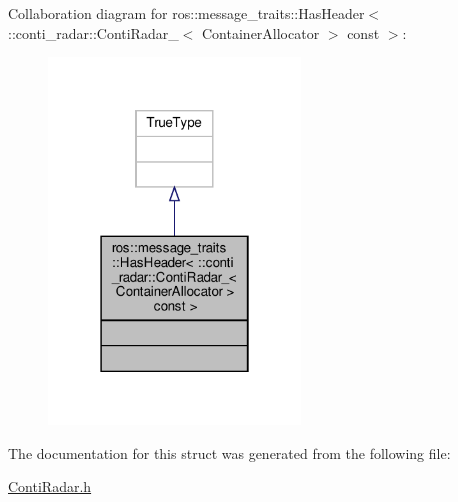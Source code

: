 Collaboration diagram for ros\+:\+:message\+\_\+traits\+:\+:Has\+Header$<$ \+:\+:conti\+\_\+radar\+:\+:Conti\+Radar\+\_\+$<$ Container\+Allocator $>$ const $>$\+:\nopagebreak
\begin{figure}[H]
\begin{center}
\leavevmode
\includegraphics[width=190pt]{db/d22/structros_1_1message__traits_1_1HasHeader_3_01_1_1conti__radar_1_1ContiRadar___3_01ContainerAllo566287a12be1a65d60f6c0aeb53b5466}
\end{center}
\end{figure}


The documentation for this struct was generated from the following file\+:\begin{DoxyCompactItemize}
\item 
\hyperlink{ContiRadar_8h}{Conti\+Radar.\+h}\end{DoxyCompactItemize}
